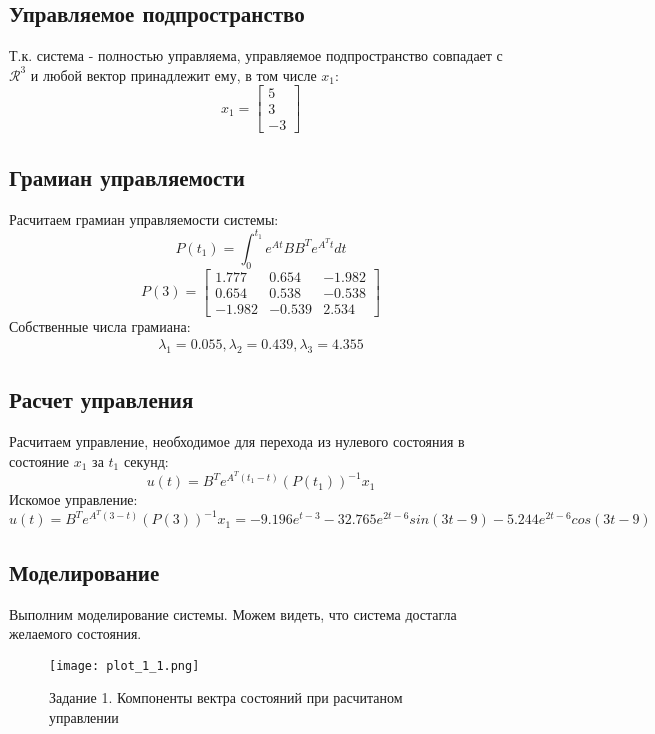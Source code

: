 \subsection{Управляемое подпространство}
Т.к. система - полностью управляема, управляемое подпространство совпадает с $\mathcal{R}^3$ и любой вектор
принадлежит ему, в том числе $x_1$:
\begin{equation*}
    x_1 = \begin{bmatrix}
        5 \\
        3 \\
        -3
    \end{bmatrix}
\end{equation*}

\subsection{Грамиан управляемости}
Расчитаем грамиан управляемости системы:
\begin{equation}
    P(t_1) = \int_{0}^{t_1}e^{At}BB^Te^{A^Tt}dt
\end{equation}
\begin{equation*}
    P(3) = \begin{bmatrix}
        1.777 & 0.654 & -1.982 \\
        0.654 & 0.538 & -0.538 \\
        -1.982 & -0.539 & 2.534
        \end{bmatrix}
\end{equation*}
Собственные числа грамиана:
\begin{eqnarray*}
    \lambda_1 = 0.055, \lambda_2 = 0.439, \lambda_3 = 4.355
\end{eqnarray*}

\subsection{Расчет управления}
Расчитаем управление, необходимое для перехода из нулевого состояния в состояние $x_1$ за $t_1$ секунд:
\begin{equation}
    u(t) = B^Te^{A^T(t_1-t)}(P(t_1))^{-1}x_1
\end{equation}
Искомое управление:
\begin{equation*}
    u(t) = B^Te^{A^T(3-t)}(P(3))^{-1}x_1 = -9.196e^{t-3} - 32.765e^{2t-6}sin(3t-9)-5.244e^{2t-6}cos(3t-9)
\end{equation*}

\subsection{Моделирование}
Выполним моделирование системы. Можем видеть, что система достагла желаемого состояния.
\begin{figure}[h]
    \centering
    \texttt{[image: plot\_1\_1.png]}
    \caption{\label{fig:The-caption-1}Задание 1. Компоненты вектра состояний при расчитаном управлении}
\end{figure}

